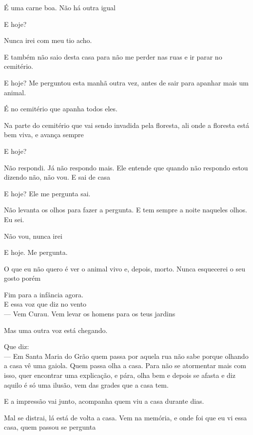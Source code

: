 É uma carne boa. Não há outra igual

E hoje?

Nunca irei com meu tio acho.

E também não saio desta casa para não me perder nas ruas e ir parar no
cemitério.

E hoje? Me perguntou esta manhã outra vez, antes de sair para apanhar
mais um animal.

É no cemitério que apanha todos eles.

Na parte do cemitério que vai sendo invadida pela floresta, ali onde a
floresta está bem viva, e avança sempre

E hoje?

Não respondi. Já não respondo mais. Ele entende que quando não respondo
estou dizendo não, não vou. E sai de casa

E hoje? Ele me pergunta sai.

Não levanta os olhos para fazer a pergunta. E tem sempre a noite
naqueles olhos. Eu sei.

Não vou, nunca irei

E hoje. Me pergunta.

O que eu não quero é ver o animal vivo e, depois, morto. Nunca
esquecerei o seu gosto porém

\breakk

\vspace*{4cm}

Fim para a infância agora.\\

E essa voz que diz no vento\\

--- Vem Curau. Vem levar os homens para os teus jardins\\

\breakk

\vspace*{4cm}

Mas uma outra voz está chegando.

Que diz:\\

--- Em Santa Maria do Grão quem passa por aquela rua não sabe porque
olhando a casa vê uma gaiola. Quem passa olha a casa. Para não se
atormentar mais com isso, quer encontrar uma explicação, e pára, olha
bem e depois se afasta e diz aquilo é só uma ilusão, vem das grades que
a casa tem.

E a impressão vai junto, acompanha quem viu a casa durante dias.

Mal se distrai, lá está de volta a casa. Vem na memória, e onde foi que
eu vi essa casa, quem passou se pergunta\\

